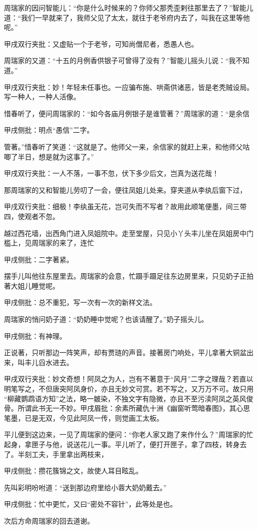 \begin{parag}


    周瑞家的因问智能儿：“你是什么时候来的？你师父那秃歪剌往那里去了？”智能儿道：“我们一早就来了，我师父见了太太，就往于老爷府内去了，叫我在这里等他呢。”\begin{note}甲戌双行夹批：又虚贴一个于老爷，可知尚僧尼者，悉愚人也。\end{note}周瑞家的又道：“十五的月例香供银子可曾得了没有？”智能儿摇头儿说：“我不知道。”\begin{note}甲戌双行夹批：妙！年轻未任事也。一应骗布施、哄斋供诸恶，皆是老秃贼设局。写一种人，一种人活像。\end{note}惜春听了，便问周瑞家的：“如今各庙月例银子是谁管著？”周瑞家的道：“是余信\begin{note}甲戌侧批：明点“愚信”二字。\end{note}管著。”惜春听了笑道：“这就是了。他师父一来，余信家的就赶上来，和他师父咕唧了半日，想是就为这事了。”\begin{note}甲戌双行夹批：一人不落，一事不忽，伏下多少后文，岂真为送花哉！\end{note}
\end{parag}


\begin{parag}


    那周瑞家的又和智能儿劳叨了一会，便往凤姐儿处来。穿夹道从李纨后窗下过，\begin{note}甲戌双行夹批：细极！李纨虽无花，岂可失而不写者？故用此顺笔便墨，间三带四，使观者不忽。\end{note}越过西花墙，出西角门进入凤姐院中。走至堂屋，只见小丫头丰儿坐在凤姐房中门槛上，见周瑞家的来了，连忙\begin{note}甲戌侧批：二字著紧。\end{note}摆手儿叫他往东屋里去。周瑞家的会意，忙蹑手蹑足往东边房里来，只见奶子正拍著大姐儿睡觉呢。\begin{note}甲戌侧批：总不重犯，写一次有一次的新样文法。\end{note}周瑞家的悄问奶子道：“奶奶睡中觉呢？也该请醒了。”奶子摇头儿。\begin{note}甲戌侧批：有神理。\end{note}正说著，只听那边一阵笑声，却有贾琏的声音。接著房门响处，平儿拿著大铜盆出来，叫丰儿舀水进去。\begin{note}甲戌双行夹批：妙文奇想！阿凤之为人，岂有不著意于“风月”二字之理哉？若直以明笔写之，不但唐突阿凤身价，亦且无妙文可赏。若不写之，又万万不可。故只用 “柳藏鹦鹉语方知”之法，略一皴染，不独文字有隐微，亦且不至污渎阿凤之英风俊骨。所谓此书无一不妙。甲戌眉批：余素所藏仇十洲《幽窗听莺暗春图》，其心思笔墨，已是无双，今见此阿凤一传，则觉画工太板。\end{note}平儿便到这边来，一见了周瑞家的便问：“你老人家又跑了来作什么？”周瑞家的忙起身，拿匣子与他，说送花儿一事。平儿听了，便打开匣子，拿了四枝，转身去了。半刻工夫，手里拿出两枝来，\begin{note}甲戌侧批：攒花簇锦之文，故使人耳目眩乱。\end{note}先叫彩明吩咐道：“送到那边府里给小蓉大奶奶戴去。”\begin{note}甲戌侧批：忙中更忙，又曰“密处不容针”，此等处是也。\end{note}次后方命周瑞家的回去道谢。
\end{parag}



